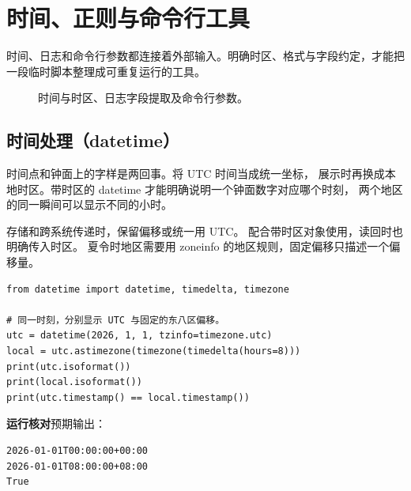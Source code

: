 \chapter{时间、正则与命令行工具}
\label{ch:11-outline}

时间、日志和命令行参数都连接着外部输入。明确时区、格式与字段约定，才能把一段临时脚本整理成可重复运行的工具。


\begin{figure}[htbp]
  \centering
  \caption*{时间与时区、日志字段提取及命令行参数。}
\end{figure}


\section[时间处理]{时间处理（datetime）}

时间点和钟面上的字样是两回事。将 UTC 时间当成统一坐标，
展示时再换成本地时区。带时区的 datetime 才能明确说明一个钟面数字对应哪个时刻，
两个地区的同一瞬间可以显示不同的小时。

存储和跨系统传递时，保留偏移或统一用 UTC。
 配合带时区对象使用，读回时也明确传入时区。
夏令时地区需要用 zoneinfo 的地区规则，固定偏移只描述一个偏移量。


\begin{lstlisting}[title={\code{time_point.py}}]
from datetime import datetime, timedelta, timezone

# 同一时刻，分别显示 UTC 与固定的东八区偏移。
utc = datetime(2026, 1, 1, tzinfo=timezone.utc)
local = utc.astimezone(timezone(timedelta(hours=8)))
print(utc.isoformat())
print(local.isoformat())
print(utc.timestamp() == local.timestamp())
\end{lstlisting}


\textbf{运行核对}\enspace 预期输出：
\begin{lstlisting}[language={},numbers=none]
2026-01-01T00:00:00+00:00
2026-01-01T08:00:00+08:00
True
\end{lstlisting}

